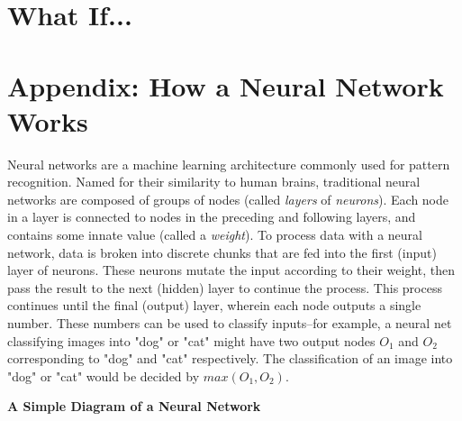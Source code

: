 \documentclass[11pt, a4paper]{article}
\begin{document}
\section{What If...}


\newpage



\newpage
\appendix
\section{Appendix: How a Neural Network Works}
\label{sec:neuralnet}
Neural networks are a machine learning architecture commonly used for pattern recognition. Named for their 
similarity to human brains, traditional neural networks are composed of groups of nodes (called 
\textit{layers} of \textit{neurons}). Each node in a layer is connected to nodes in the preceding and following
layers, and contains some innate value (called a \textit{weight}). To process data with a neural network, data
is broken into discrete chunks that are fed into the first (input) layer of neurons. These neurons mutate the 
input according to their weight, then pass the result to the next (hidden) layer to continue the process. This 
process continues until the final (output) layer, wherein each node outputs a single number. These numbers can 
be used to classify inputs--for example, a neural net classifying images into "dog" or "cat" might have two
output nodes $O_1$ and $O_2$ corresponding to "dog" and "cat" respectively. The classification of an image into
"dog" or "cat" would be decided by $max(O_1, O_2)$. \\
\begin{center}
    \textbf{A Simple Diagram of a Neural Network}\\
    
\end{center}
\end{document}
